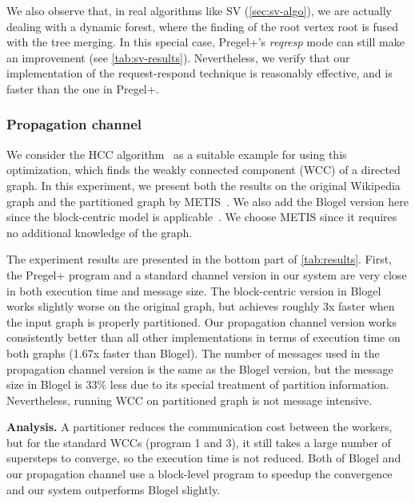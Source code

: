 \documentclass{sokendai_thesis} %
\newcommand{\PP}{Pregel+}
\begin{document}
We also observe that, in real algorithms like SV (\autoref{sec:sv-algo}), we are actually dealing with a dynamic forest, where the finding of the root vertex root is fused with the tree merging.
In this special case, \PP{}'s \textit{reqresp} mode can still make an improvement (see \autoref{tab:sv-results}).
Nevertheless, we verify that our implementation of the request-respond technique is reasonably effective, and is faster than the one in \PP{}.

\subsubsection{Propagation channel}

We consider the HCC algorithm~\cite{pegasus} as a suitable example for using this optimization, which finds the weakly connected component (WCC) of a directed graph.
In this experiment, we present both the results on the original Wikipedia graph and the partitioned graph by METIS~\cite{metis}.
We also add the Blogel version here since the block-centric model is applicable~\cite{yan2014blogel}.
We choose METIS since it requires no additional knowledge of the graph.

The experiment results are presented in the bottom part of \autoref{tab:results}.
First, the \PP{} program and a standard channel version in our system are very close in both execution time and message size.
The block-centric version in Blogel works slightly worse on the original graph, but achieves roughly 3x faster when the input graph is properly partitioned.
Our propagation channel version works consistently better than all other implementations in terms of execution time on both graphs (1.67x faster than Blogel).
The number of messages used in the propagation channel version is the same as the Blogel version, but the message size in Blogel is $33\%$ less due to its special treatment of partition information.
Nevertheless, running WCC on partitioned graph is not message intensive.

\textbf{Analysis.}
A partitioner reduces the communication cost between the workers, but for the standard WCCs (program 1 and 3), it still takes a large number of supersteps to converge, so the execution time is not reduced.
Both of Blogel and our propagation channel use a block-level program to speedup the convergence and our system outperforms Blogel slightly.
\end{document}
